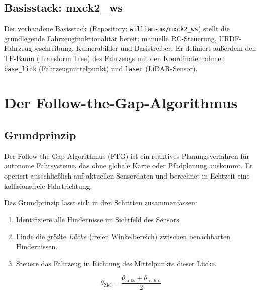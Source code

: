 \subsection{Basisstack: mxck2\_ws}

Der vorhandene Basisstack (Repository: \texttt{william-mx/mxck2\_ws})
stellt die grundlegende Fahrzeugfunktionalität bereit: manuelle
RC-Steuerung, URDF-Fahrzeugbeschreibung, Kamerabilder und Basistreiber.
Er definiert außerdem den TF-Baum (Transform Tree) des Fahrzeugs mit
den Koordinatenrahmen \texttt{base\_link} (Fahrzeugmittelpunkt) und
\texttt{laser} (LiDAR-Sensor).


\section{Der Follow-the-Gap-Algorithmus}

\subsection{Grundprinzip}

Der Follow-the-Gap-Algorithmus (FTG) ist ein reaktives Planungsverfahren
für autonome Fahrsysteme, das ohne globale Karte oder Pfadplanung auskommt.
Er operiert ausschließlich auf aktuellen Sensordaten und berechnet in
Echtzeit eine kollisionsfreie Fahrtrichtung.

Das Grundprinzip lässt sich in drei Schritten zusammenfassen:
\begin{enumerate}
    \item Identifiziere alle Hindernisse im Sichtfeld des Sensors.
    \item Finde die größte \emph{Lücke} (freien Winkelbereich) zwischen benachbarten Hindernissen.
    \item Steuere das Fahrzeug in Richtung des Mittelpunkts dieser Lücke.
\end{enumerate}

\begin{equation}
    \theta_{\text{Ziel}} = \frac{\theta_{\text{links}} + \theta_{\text{rechts}}}{2}
    \label{eq:gap_center}
\end{equation}

